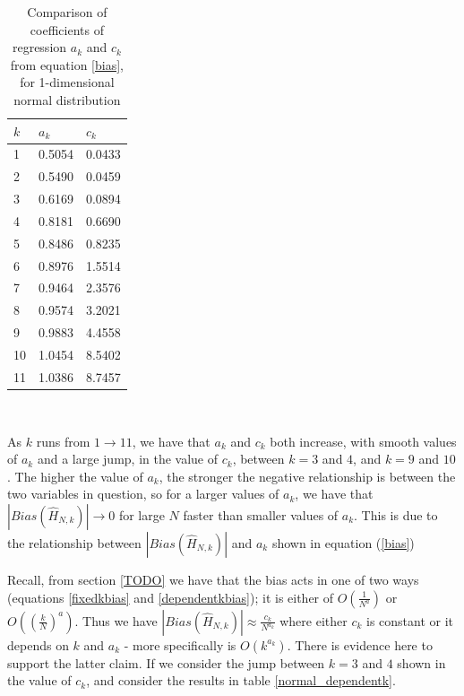 \documentclass{report}
\begin{document}
\begin{table}
\caption{Comparison of coefficients of regression $a_{k}$ and $c_{k}$ from equation \ref{bias}, for 1-dimensional normal distribution} \label{normal_a_c_compare_table}
\begin{center}
\begin{tabular}{| l | l l |} 
\toprule
$k$ &  $a_{k}$ & $c_{k}$ \\
\midrule[1pt]
1  &  0.5054 & 0.0433 \\
2  & 0.5490 & 0.0459 \\
3  & 0.6169 & 0.0894 \\
4  & 0.8181 & 0.6690 \\
5  & 0.8486 & 0.8235 \\
6  & 0.8976 & 1.5514 \\
7  & 0.9464 & 2.3576 \\
8  & 0.9574 & 3.2021 \\
9  & 0.9883 & 4.4558 \\
10 & 1.0454 & 8.5402 \\
11 & 1.0386 & 8.7457 \\
\hline
\end{tabular}
\\[10pt]
\end{center}
\end{table}

As $k$ runs from $1 \to 11$, we have that $a_{k}$ and $c_{k}$ both increase, with smooth values of $a_{k}$ and a large jump, in the value of $c_{k}$, between $k=3$ and $4$, and $k=9$ and $10$. The higher the value of $a_{k}$, the stronger the negative relationship is between the two variables in question, so for a larger values of $a_{k}$, we have that $|Bias(\hat{H}_{N, k})| \to 0$ for large $N$ faster than smaller values of $a_{k}$. This is due to the relationship between $|Bias(\hat{H}_{N, k})|$ and $a_{k}$ shown in equation (\ref{bias})

Recall, from section \ref{TODO} we have that the bias acts in one of two ways (equations \ref{fixedkbias} and \ref{dependentkbias}); it is either of $O \left( \frac{1}{N^{a}} \right)$ or $O\left( \left( \frac{k}{N} \right)^{a} \right)$. Thus we have $|Bias(\hat{H}_{N, k})|\approx \frac{c_{k}}{N^{a_{k}}}$ where either $c_{k}$ is constant or it depends on $k$ and $a_{k}$ - more specifically is $O( k^{a_{k}})$. There is evidence here to support the latter claim. If we consider the jump between $k=3$ and $4$ shown in the value of $c_{k}$, and consider the results in table \ref{normal_dependentk}. 
\end{document}
